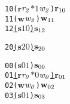 \newsavebox{\boxnoone}
\begin{lrbox}{\boxnoone}
\begin{minipage}[t]{0.65\linewidth}
\large
\begin{alltt}
10 (\(\mathbf{r}\) \(\mathit{r\sb{2}}\) \(\mathit{\ast 1}\) \(\mathit{w\sb{2}}\)) \(\mathbf{r}\sb{10}\)
11 (\(\mathbf{w}\) \(\mathit{w\sb{2}}\)) \(\mathbf{w}\sb{11}\)
12 \underline{(\(\mathbf{s}\) \(\mathit{1 0}\)) \(\mathbf{s}\sb{12}\)}
\end{alltt}
\end{minipage}
\end{lrbox}

\newsavebox{\boxnotwo}
\begin{lrbox}{\boxnotwo}
\begin{minipage}[t]{0.65\linewidth}
\large
\begin{alltt}
20 \underline{(\(\mathbf{s}\) \(\mathit{2 0}\)) \(\mathbf{s}\sb{20}\)}
\end{alltt}
\end{minipage}
\end{lrbox}


\newcommand\examplefigtwo{
\begin{figure*}[tb]
\begin{center}
\setlength{\tabcolsep}{2pt}
\begin{tabular}[t]{c|c|c}
$\mathit{p_0}$ & $\mathit{p_1}$ & $\mathit{p_2}$ \\
\hline
\scalebox{0.8}{\usebox{\boxnozero}}&
\scalebox{0.8}{\usebox{\boxnoone}} &
\scalebox{0.8}{\usebox{\boxnotwo}}\\
\end{tabular}
\end{center}
\caption{No Deadlock Caused by Orphaned Receive}
\label{fig:nodeadlock1}
\end{figure*}
}


\newsavebox{\boxone}
\begin{lrbox}{\boxone}
\begin{minipage}[t]{0.65\linewidth}
\large
\begin{alltt}
00 (\(\mathbf{s}\) \(\mathit{0 1}\)) \(\mathbf{s}\sb{00}\)
01 \underline{(\(\mathbf{r}\) \(\mathit{r\sb{0}}\) \(\mathit{\ast 0}\) \(\mathit{w\sb{0}}\)) \(\mathbf{r}\sb{01}\)}
02 (\(\mathbf{w}\) \(\mathit{w\sb{0}}\)) \(\mathbf{w}\sb{02}\)
03 \underline{(\(\mathbf{s}\) \(\mathit{0 1}\)) \(\mathbf{s}\sb{03}\)}
\end{alltt}
\end{minipage}
\end{lrbox}

